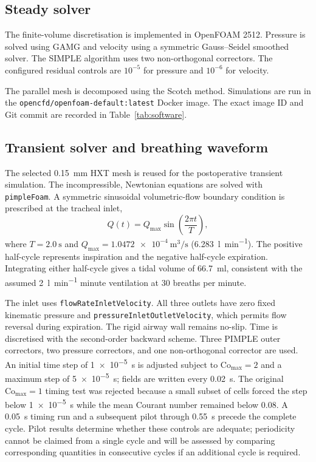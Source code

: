 \documentclass[11pt,a4paper]{article}
\begin{document}
\subsection{Steady solver}

The finite-volume discretisation is implemented in OpenFOAM 2512. Pressure is
solved using GAMG and velocity using a symmetric Gauss--Seidel smoothed solver.
The SIMPLE algorithm uses two non-orthogonal correctors. The configured residual
controls are $10^{-5}$ for pressure and $10^{-6}$ for velocity.

The parallel mesh is decomposed using the Scotch method. Simulations are run in
the \texttt{opencfd/openfoam-default:latest} Docker image. The exact image ID
and Git commit are recorded in Table~\ref{tab:software}.

\subsection{Transient solver and breathing waveform}
\label{sec:transient_method}

The selected \num{0.15}~mm HXT mesh is reused for the postoperative transient
simulation. The incompressible, Newtonian equations are solved with
\texttt{pimpleFoam}. A symmetric sinusoidal volumetric-flow boundary condition is
prescribed at the tracheal inlet,
\begin{equation}
  Q(t)=Q_{\max}\sin\left(\frac{2\pi t}{T}\right),
\end{equation}
where $T=\SI{2.0}{\second}$ and
$Q_{\max}=\SI{1.0472e-4}{\metre\cubed\per\second}$
(\SI{6.283}{\litre\per\minute}). The positive half-cycle represents inspiration
and the negative half-cycle expiration. Integrating either half-cycle gives a
tidal volume of \SI{66.7}{\milli\litre}, consistent with the assumed
\SI{2}{\litre\per\minute} minute ventilation at 30 breaths per minute.

The inlet uses \texttt{flowRateInletVelocity}. All three outlets have zero fixed
kinematic pressure and \texttt{pressureInletOutletVelocity}, which permits flow
reversal during expiration. The rigid airway wall remains no-slip. Time is
discretised with the second-order backward scheme. Three PIMPLE outer correctors,
two pressure correctors, and one non-orthogonal corrector are used. An initial
time step of \SI{1e-5}{\second} is adjusted subject to $\mathrm{Co}_{\max}=2$
and a maximum step of \SI{5e-5}{\second}; fields are written every
\SI{0.02}{\second}. The original $\mathrm{Co}_{\max}=1$ timing test was rejected
because a small subset of cells forced the step below \SI{1e-5}{\second} while
the mean Courant number remained below 0.08. A \SI{0.05}{\second} timing run and
a subsequent pilot through \SI{0.55}{\second} precede the complete cycle. Pilot
results determine whether these controls are adequate;
periodicity cannot be claimed from a single cycle and will be assessed by
comparing corresponding quantities in consecutive cycles if an additional cycle
is required.
\end{document}
